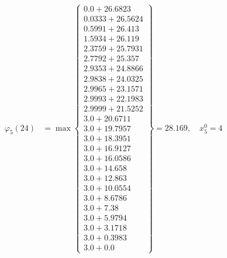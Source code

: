 \documentclass{article}
\begin{document}
\begin{align*}
\varphi_{5}(24) &= \max \left\{ \begin{array}{c}
0.0 + 26.6823 \\
 0.0333 + 26.5624 \\
 0.5991 + 26.413 \\
 1.5934 + 26.119 \\
 2.3759 + 25.7931 \\
 2.7792 + 25.357 \\
 2.9353 + 24.8866 \\
 2.9838 + 24.0325 \\
 2.9965 + 23.1571 \\
 2.9993 + 22.1983 \\
 2.9999 + 21.5252 \\
 3.0 + 20.6711 \\
 3.0 + 19.7957 \\
 3.0 + 18.3951 \\
 3.0 + 16.9127 \\
 3.0 + 16.0586 \\
 3.0 + 14.658 \\
 3.0 + 12.863 \\
 3.0 + 10.0554 \\
 3.0 + 8.6786 \\
 3.0 + 7.38 \\
 3.0 + 5.9794 \\
 3.0 + 3.1718 \\
 3.0 + 0.3983 \\
 3.0 + 0.0
\end{array} \right\}=28.169, \quad x_{5}^0=4\\
  

\end{align*}
\end{document}
